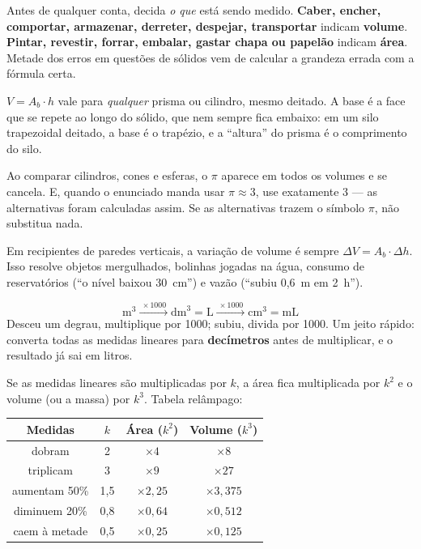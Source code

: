 \begin{dica}
Antes de qualquer conta, decida \emph{o que} está sendo medido. \textbf{Caber,
encher, comportar, armazenar, derreter, despejar, transportar} indicam
\textbf{volume}. \textbf{Pintar, revestir, forrar, embalar, gastar chapa ou
papelão} indicam \textbf{área}. Metade dos erros em questões de sólidos vem de
calcular a grandeza errada com a fórmula certa.
\end{dica}

\begin{dica}
$V = A_b\cdot h$ vale para \emph{qualquer} prisma ou cilindro, mesmo deitado. A
base é a face que se repete ao longo do sólido, que nem sempre fica embaixo: em
um silo trapezoidal deitado, a base é o trapézio, e a “altura” do prisma é o
comprimento do silo.
\end{dica}

\begin{dica}
Ao comparar cilindros, cones e esferas, o $\pi$ aparece em todos os volumes e se
cancela. E, quando o enunciado manda usar $\pi\approx 3$, use exatamente 3 —
as alternativas foram calculadas assim. Se as alternativas trazem o símbolo
$\pi$, não substitua nada.
\end{dica}

\begin{dica}
Em recipientes de paredes verticais, a variação de volume é sempre
$\Delta V = A_b\cdot\Delta h$. Isso resolve objetos mergulhados, bolinhas
jogadas na água, consumo de reservatórios (“o nível baixou 30~cm”) e vazão
(“subiu 0,6~m em 2~h”).
\end{dica}

\begin{macete}
\[
\text{m}^3 \xrightarrow{\ \times 1000\ } \text{dm}^3 = \text{L}
\xrightarrow{\ \times 1000\ } \text{cm}^3 = \text{mL}
\]
Desceu um degrau, multiplique por 1000; subiu, divida por 1000. Um jeito
rápido: converta todas as medidas lineares para \textbf{decímetros} antes de
multiplicar, e o resultado já sai em litros.
\end{macete}

\begin{macete}[$k$, $k^2$, $k^3$]
Se as medidas lineares são multiplicadas por $k$, a área fica multiplicada por
$k^2$ e o volume (ou a massa) por $k^3$. Tabela relâmpago:
\begin{center}
\begin{tabular}{cccc}
\toprule
Medidas & $k$ & Área ($k^2$) & Volume ($k^3$)\\
\midrule
dobram & 2 & $\times 4$ & $\times 8$\\
triplicam & 3 & $\times 9$ & $\times 27$\\
aumentam 50\% & 1,5 & $\times 2{,}25$ & $\times 3{,}375$\\
diminuem 20\% & 0,8 & $\times 0{,}64$ & $\times 0{,}512$\\
caem à metade & 0,5 & $\times 0{,}25$ & $\times 0{,}125$\\
\bottomrule
\end{tabular}
\end{center}
\end{macete}

